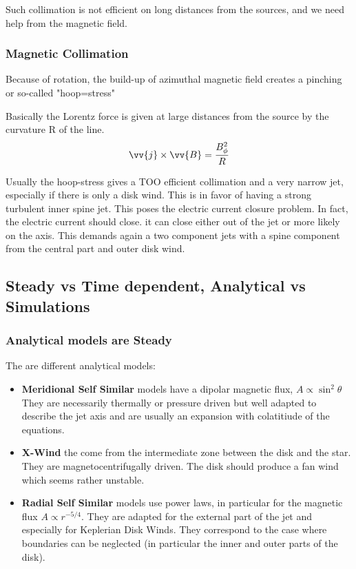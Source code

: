 \documentclass[10pt,a4paper,english]{article}
\begin{document}

Such collimation is not efficient on long distances from the sources, and we need help from the magnetic field.

\subsubsection{Magnetic Collimation}
Because of rotation, the build-up of azimuthal magnetic field creates a pinching or so-called "hoop=stress"


Basically the Lorentz force is given at large distances from the source by the curvature R of the line.
\begin{equation}
    \vv{j} \times \vv{B} = \frac{B^2_{\phi}}{R}
\end{equation}

Usually the hoop-stress gives a TOO efficient collimation and a very narrow jet, especially if there is only a disk wind.
This is in favor of having a strong turbulent inner spine jet. This poses the electric current closure problem. In fact,
the electric current should close. it can close either out of the jet or more likely  on the axis. This demands again a
two component jets with a spine component  from the central part and outer disk wind.
\subsection{Steady vs Time dependent, Analytical vs Simulations}

\subsubsection{Analytical models are Steady}
The are different analytical models:
\begin{itemize}
    \item \textbf{Meridional Self Similar} models have a dipolar magnetic flux, $A \propto \sin^2\theta$ They are necessarily thermally or pressure driven but well adapted to describe the jet axis and are usually an expansion with colatitiude of the equations.
    \item \textbf{X-Wind} the come from the intermediate zone between the disk and the star. They are magnetocentrifugally driven. The disk should produce a fan wind which seems rather unstable.
    \item \textbf{Radial Self Similar} models use power laws, in particular for the magnetic flux $A \propto r^{-5/4}$. They are adapted for the external part of the jet and especially for Keplerian Disk Winds. They correspond to the case where boundaries can be neglected (in particular the inner and outer parts of the disk).

\end{itemize}
\end{document}
